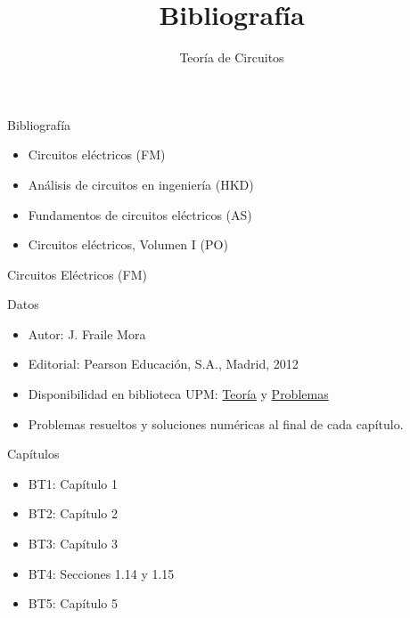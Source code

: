 \documentclass[xcolor={usenames,svgnames,dvipsnames}]{beamer}
\date{}
\title{Bibliografía}
\subtitle{Teoría de Circuitos}
\begin{document}
\maketitle


\begin{frame}[label={sec:orgab6543b}]{Bibliografía}
\begin{itemize}
\item Circuitos eléctricos (\alert{FM})
\item Análisis de circuitos en ingeniería (\alert{HKD})
\item Fundamentos de circuitos eléctricos (\alert{AS})
\item Circuitos eléctricos, Volumen I (\alert{PO})
\end{itemize}
\end{frame}


\begin{frame}[label={sec:org8f30624}]{Circuitos Eléctricos (\alert{FM})}
\begin{block}{Datos}
\begin{itemize}
\item Autor: J. Fraile Mora
\item Editorial: Pearson Educación, S.A., Madrid, 2012
\item Disponibilidad en biblioteca UPM: \href{https://ingenio.upm.es/primo-explore/fulldisplay?docid=34UPM\_ALMA2150534070004212\&context=L\&vid=34UPM\_VU1\&search\_scope=TAB1\_SCOPE1\&tab=tab1\&lang=es\_ES}{Teoría} y \href{https://ingenio.upm.es/permalink/f/1vo0cl5/34UPM\_ALMA2164586310004212}{Problemas}
\item Problemas resueltos y soluciones numéricas al final de cada capítulo.
\end{itemize}
\end{block}

\begin{block}{Capítulos}
\begin{itemize}
\item BT1: Capítulo 1
\item BT2: Capítulo 2
\item BT3: Capítulo 3
\item BT4: Secciones 1.14 y 1.15
\item BT5: Capítulo 5
\end{itemize}
\end{block}
\end{frame}
\end{document}
